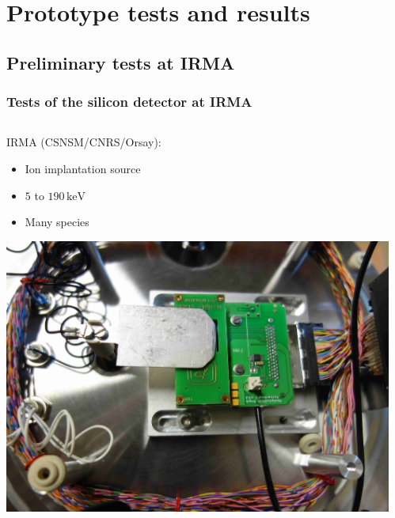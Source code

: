
\section{Prototype tests and results}
\subsection{Preliminary tests at IRMA}
\begin{frame}[t]
  \frametitle{Tests of the silicon detector at IRMA}
  \begin{columns}
    \begin{column}{0.45\textwidth}
      IRMA (CSNSM/CNRS/Orsay):
      \begin{itemize}
        \item Ion implantation source
        \item $5$ to $190\,\mathrm{keV}$
        \item Many species
      \end{itemize}
      \includegraphics[width=\textwidth]{04_Test/fig/fig000_IRMA_setup01.jpg}
    \end{column}
    \begin{column}{0.45\textwidth}
      \begin{columns}
        \begin{column}{0.45\textwidth}

\end{column}
\end{columns}
\end{column}
\end{columns}
\end{frame}
